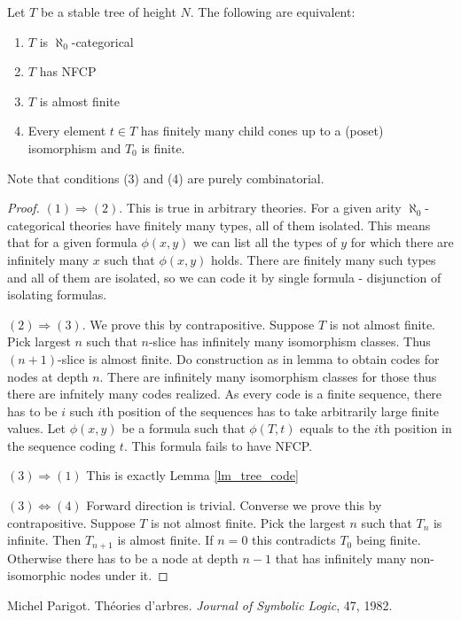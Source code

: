 \documentclass{amsart}
\begin{document}
\begin{Theorem} \label{th_tree_nfcp}
	Let $T$ be a stable tree of height $N$. The following are equivalent:
	\begin{enumerate}
		\item $T$ is $\aleph_0$-categorical
		\item $T$ has NFCP
		\item $T$ is almost finite
		\item Every element $t \in T$ has finitely many child cones up to a (poset) isomorphism and $T_0$ is finite.
	\end{enumerate}
\end{Theorem}

Note that conditions (3) and (4) are purely combinatorial.

\begin{proof}
	$(1) \Rightarrow (2)$. This is true in arbitrary theories. For a given arity $\aleph_0$-categorical theories have finitely many types, all of them isolated. This means that for a given formula $\phi(x, y)$ we can list all the types of $y$ for which there are infinitely many $x$ such that $\phi(x, y)$ holds. There are finitely many such types and all of them are isolated, so we can code it by single formula - disjunction of isolating formulas.
	
	$(2) \Rightarrow (3)$. We prove this by contrapositive. Suppose $T$ is not almost finite. Pick largest $n$ such that $n$-slice has infinitely many isomorphism classes. Thus $(n+1)$-slice is almost finite. Do construction as in lemma to obtain codes for nodes at depth $n$. There are infinitely many isomorphism classes for those thus there are infnitely many codes realized. As every code is a finite sequence, there has to be $i$ such $i$th position of the sequences has to take arbitrarily large finite values. Let $\phi(x,y)$ be a formula such that $\phi(T, t)$ equals to the $i$th position in the sequence coding $t$. This formula fails to have NFCP.
	
	$(3) \Rightarrow (1)$ This is exactly Lemma \ref{lm_tree_code} %
	
	$(3) \Leftrightarrow (4)$ Forward direction is trivial. Converse we prove this by contrapositive. Suppose $T$ is not almost finite. Pick the largest $n$ such that $T_n$ is infinite. Then $T_{n+1}$ is almost finite. If $n=0$ this contradicts $T_0$ being finite. Otherwise there has to be a node at depth $n-1$ that has infinitely many non-isomorphic nodes under it. 
\end{proof}

\begin{thebibliography}{9}

	Michel Parigot.
	Th\'eories d'arbres.
	\textit{Journal of Symbolic Logic}, 47, 1982.
	
\end{thebibliography}
\end{document}
